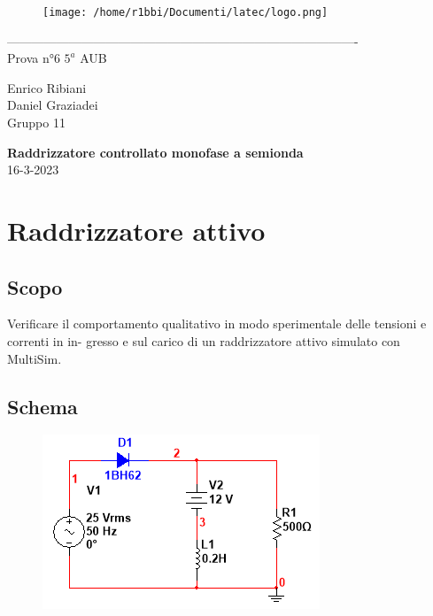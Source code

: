 \documentclass[12pt]{article}
\begin{document}
\begin{titlepage}
	\begin{center}
		\begin{figure}
			\centering
			\texttt{[image: /home/r1bbi/Documenti/latec/logo.png]}

		\end{figure}
		-------------------------------------------------------------------------------------\\
		\vspace{2\baselineskip}
		\large Prova n°6
		\hfill
		\large $5^a$   AUB\\
		\begin{flushleft}
			\large Enrico Ribiani\\
			\large Daniel Graziadei\\
			\large Gruppo 11\\
		\end{flushleft}


		\vfill

		\Huge{\textbf{Raddrizzatore controllato monofase a semionda}}\\
		\vfill
		\vfill
		\large{16-3-2023}
	\end{center}
\end{titlepage}
\thispagestyle{empty}
\tableofcontents
\newpage
\setcounter{page}{1}
\vskip 1cm
\section{Raddrizzatore attivo}
\subsection{Scopo}
Verificare il comportamento qualitativo in modo sperimentale delle tensioni e correnti in in-
gresso e sul carico di un raddrizzatore attivo simulato con MultiSim.\\

\subsection{Schema}
\begin{figure}[!h]
	\includegraphics[scale=0.7]{schema-es1.PNG}
\end{figure}
\end{document}
